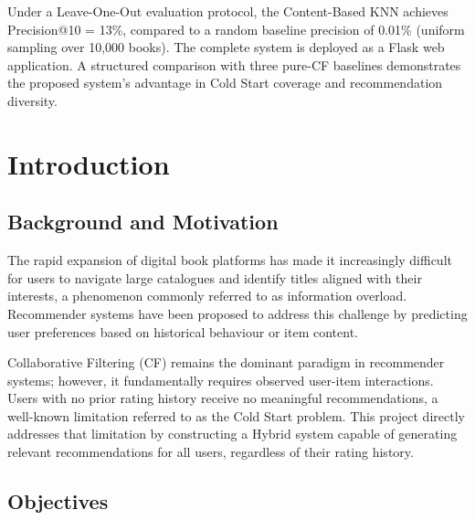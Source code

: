 \documentclass[12pt, a4paper]{article}
\begin{document}
Under a Leave-One-Out evaluation protocol, the Content-Based KNN achieves
Precision@10 = 13\%, compared to a random baseline precision of 0.01\%
(uniform sampling over 10,000 books).
The complete system is deployed as a Flask web application.
A structured comparison with three pure-CF baselines demonstrates the proposed
system's advantage in Cold Start coverage and recommendation diversity.

\newpage
\thispagestyle{fancy}
\tableofcontents

\newpage
\thispagestyle{fancy}
\listoffigures
{}
\listoftables
{}

\newpage
\section{Introduction}

\subsection{Background and Motivation}

The rapid expansion of digital book platforms has made it increasingly difficult for
users to navigate large catalogues and identify titles aligned with their interests,
a phenomenon commonly referred to as information overload.
Recommender systems have been proposed to address this challenge by predicting
user preferences based on historical behaviour or item content.

Collaborative Filtering (CF) remains the dominant paradigm in recommender systems;
however, it fundamentally requires observed user-item interactions.
Users with no prior rating history receive no meaningful recommendations,
a well-known limitation referred to as the Cold Start problem.
This project directly addresses that limitation by constructing a Hybrid system
capable of generating relevant recommendations for all users,
regardless of their rating history.

\subsection{Objectives}
\end{document}

